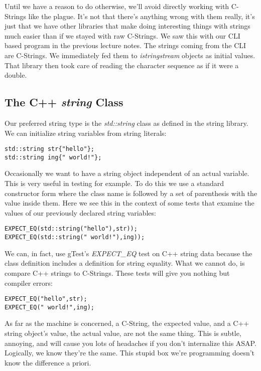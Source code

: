 \documentclass[]{tufte-handout}
\begin{document}
Until we have a reason to do otherwise, we'll avoid directly working with C-Strings like the plague. It's not that there's anything wrong with them really, it's just that we have other libraries that make doing interesting things with strings much easier than if we stayed with raw C-Strings. We saw this with our CLI based program in the previous lecture notes. The strings coming from the CLI are C-Strings. We immediately fed them to \textit{istringstream} objects as initial values. That library then took care of reading the character sequence as if it were a double. 

\subsection{The C++ \textit{string} Class}

Our preferred string type is the \textit{std::string} class as defined in the string library.  We can initialize string variables from string literals:
\begin{verbatim}
std::string str{"hello"};
std::string ing{" world!"};
\end{verbatim}
Occasionally we want to have a string object independent of an actual variable. This is very useful in testing for example. To do this we use a standard constructor form where the class name is followed by a set of parenthesis with the value inside them.  Here we see this in the context of some tests that examine the values of our previously declared string variables:
\begin{verbatim}
EXPECT_EQ(std::string("hello"),str));
EXPECT_EQ(std::string(" world!"),ing));
\end{verbatim}

We can, in fact, use gTest's \textit{EXPECT\_EQ} test on C++ string data because the class definition includes a definition for string equality. What we cannot do, is compare C++ strings to C-Strings. These tests will give you nothing but compiler errors:
\begin{verbatim}
EXPECT_EQ("hello",str);
EXPECT_EQ(" world!",ing);
\end{verbatim}
As far as the machine is concerned, a C-String, the expected value, and a C++ string object's value, the actual value, are not the same thing. This is subtle, annoying, and will cause you lots of headaches if you don't internalize this ASAP. Logically, we know they're the same. This stupid box we're programming doesn't know the difference a priori.
\end{document}
